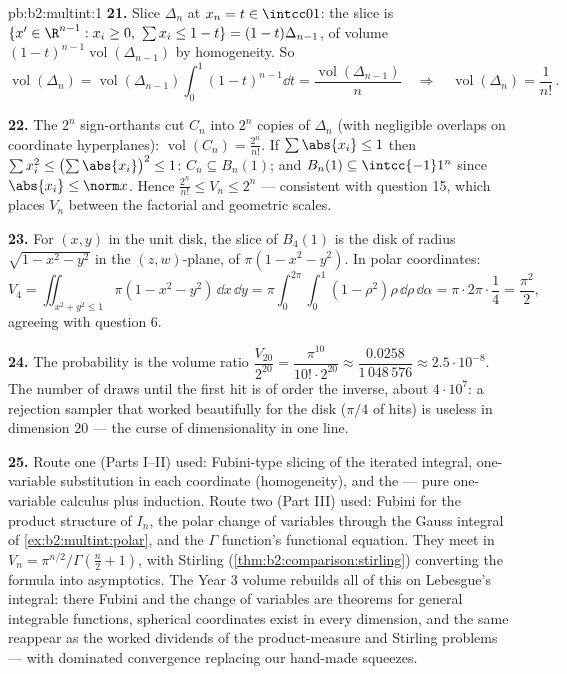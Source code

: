 \begin{solution}{pb:b2:multint:1}
\textbf{21.} Slice $\Delta_n$ at $x_n = t \in \intcc01$: the
slice is $\{x' \in \R^{n-1} : x_i \geq 0,\ \sum x_i \leq 1 -
t\} = (1-t)\Delta_{n-1}$, of volume
$(1-t)^{n-1}\operatorname{vol}(\Delta_{n-1})$ by homogeneity.
So
\[
\operatorname{vol}(\Delta_n) =
\operatorname{vol}(\Delta_{n-1})\int_0^1(1 - t)^{n-1}\dd t =
\frac{\operatorname{vol}(\Delta_{n-1})}{n}
\quad\Longrightarrow\quad
\operatorname{vol}(\Delta_n) = \frac1{n!}\,.
\]

\textbf{22.} The $2^n$ sign-orthants cut $C_n$ into $2^n$
copies of $\Delta_n$ (with negligible overlaps on coordinate
hyperplanes): $\operatorname{vol}(C_n) = \frac{2^n}{n!}$. If
$\sum\abs{x_i} \leq 1$ then $\sum x_i^2 \leq
\bigl(\sum\abs{x_i}\bigr)^2 \leq 1$: $C_n \subseteq B_n(1)$;
and $B_n(1) \subseteq \intcc{-1}1^n$ since $\abs{x_i} \leq
\norm x$. Hence $\frac{2^n}{n!} \leq V_n \leq 2^n$ ---
consistent with question 15, which places $V_n$ between the
factorial and geometric scales.

\textbf{23.} For $(x, y)$ in the unit disk, the slice of
$B_4(1)$ is the disk of radius $\sqrt{1 - x^2 - y^2}$ in the
$(z, w)$-plane, of  $\pi(1 - x^2 - y^2)$. In polar
coordinates:
\[
V_4 = \iint_{x^2+y^2\leq1}\pi(1 - x^2 - y^2)\,\dd x\,\dd y
= \pi\int_0^{2\pi}\!\!\int_0^1(1 - \rho^2)\rho\,
\dd\rho\,\dd\alpha
= \pi\cdot2\pi\cdot\frac14 = \frac{\pi^2}2 ,
\]
agreeing with question 6.

\textbf{24.} The probability is the volume ratio
$\dfrac{V_{20}}{2^{20}} = \dfrac{\pi^{10}}{10!\cdot2^{20}}
\approx \dfrac{0.0258}{1\,048\,576} \approx
2.5\cdot10^{-8}$. The number of draws until the first hit is
of order the inverse, about $4\cdot10^7$: a rejection sampler
that worked beautifully for the disk ($\pi/4$ of hits) is
useless in dimension $20$ --- the curse of dimensionality in
one line.

\textbf{25.} Route one (Parts I--II) used: Fubini-type
slicing of the iterated integral, one-variable substitution
in each coordinate (homogeneity), and the 
--- pure one-variable calculus plus induction. Route two
(Part III) used: Fubini for the product structure of $I_n$,
the polar change of variables through the Gauss integral of
\cref{ex:b2:multint:polar}, and the $\Gamma$ function's
functional equation. They meet in $V_n =
\pi^{n/2}/\Gamma(\frac n2 + 1)$, with Stirling
(\cref{thm:b2:comparison:stirling}) converting the formula
into asymptotics. The Year 3 volume rebuilds all of this on
Lebesgue's integral: there Fubini and the change of variables
are theorems for general integrable functions, spherical
coordinates exist in every dimension, and the same  reappear as the worked dividends of the
product-measure and Stirling problems --- with dominated
convergence replacing our hand-made squeezes.
\end{solution}
